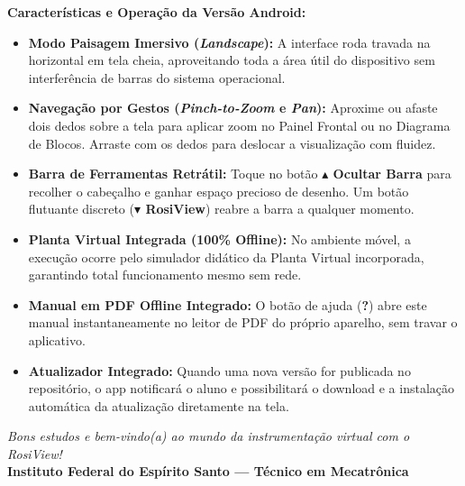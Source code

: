 \documentclass[11pt,a4paper]{article}
\begin{document}
\begin{destaque}
\textbf{Características e Operação da Versão Android:}
\begin{itemize}[leftmargin=*]
    \item \textbf{Modo Paisagem Imersivo (\textit{Landscape}):} A interface roda travada na horizontal em tela cheia, aproveitando toda a área útil do dispositivo sem interferência de barras do sistema operacional.
    \item \textbf{Navegação por Gestos (\textit{Pinch-to-Zoom} e \textit{Pan}):} Aproxime ou afaste dois dedos sobre a tela para aplicar zoom no Painel Frontal ou no Diagrama de Blocos. Arraste com os dedos para deslocar a visualização com fluidez.
    \item \textbf{Barra de Ferramentas Retrátil:} Toque no botão \textbf{$\blacktriangle$ Ocultar Barra} para recolher o cabeçalho e ganhar espaço precioso de desenho. Um botão flutuante discreto (\textbf{$\blacktriangledown$ RosiView}) reabre a barra a qualquer momento.
    \item \textbf{Planta Virtual Integrada (100\% Offline):} No ambiente móvel, a execução ocorre pelo simulador didático da Planta Virtual incorporada, garantindo total funcionamento mesmo sem rede.
    \item \textbf{Manual em PDF Offline Integrado:} O botão de ajuda (\textbf{?}) abre este manual instantaneamente no leitor de PDF do próprio aparelho, sem travar o aplicativo.
    \item \textbf{Atualizador Integrado:} Quando uma nova versão for publicada no repositório, o app notificará o aluno e possibilitará o download e a instalação automática da atualização diretamente na tela.
\end{itemize}
\end{destaque}

\vspace{0.6cm}
\begin{center}
    \textit{Bons estudos e bem-vindo(a) ao mundo da instrumentação virtual com o RosiView!}\\[0.2cm]
    \textbf{Instituto Federal do Espírito Santo --- Técnico em Mecatrônica}
\end{center}
\end{document}
